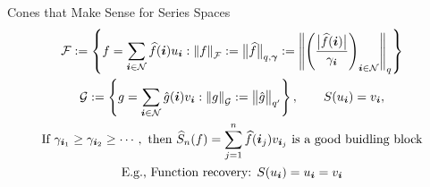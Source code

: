 \documentclass[11pt,compress,xcolor={usenames,dvipsnames},aspectratio=169]{beamer}
\begin{document}
\begin{frame}{Cones that Make Sense for Series Spaces}
\begin{gather*}
    \cf := \left \{ f = \sum_{\vi \in \cn} \hf(\vi) u_{\vi} : \norm[\cf]{f} := \bignorm[q,\vgamma]{\hf} : = \norm[q]{\left(\frac{\bigabs{\hf(\vi)}}{\gamma_{\vi}} \right)_{\vi \in \cn}} \right \} \\
    \cg : = \left \{ g = \sum_{\vi \in \cn} \hg(\vi) v_{\vi} : \norm[\cg]{g} := \bignorm[q']{\hg}\right \}, \qquad S(u_{\vi}) = v_{\vi}, \\
    \text{If } \gamma_{\vi_1} \ge \gamma_{\vi_2} \ge \cdots, \text{ then } \hS_n(f) = \sum_{j=1}^n \hf(\vi_j) v_{\vi_j} \text{ is a good buidling block} \\
    \text{E.g., Function recovery: } S(u_{\vi}) = u_{\vi} = v_{\vi}
\end{gather*}

    
\end{frame}



\thankyouframe

\printbibliography
\end{document}

